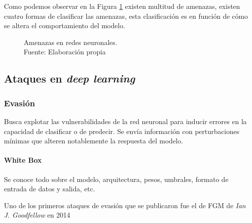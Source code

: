 Como podemos observar en la Figura \ref{fig:art-adversarial-threats} existen multitud de amenazas, existen cuatro formas de clasificar las amenazas, esta clasificación es en función de cómo se altera el comportamiento del modelo.

\begin{figure}[H]
    \centering
    \centerline{}
    \caption{Amenazas en redes neuronales.\\Fuente: Elaboración propia}
    \label{fig:art-adversarial-threats}
\end{figure}



\subsection{Ataques en \textit{deep learning}}

\subsubsection{Evasión}
Busca explotar las vulnerabilidades de la red neuronal para inducir errores en la capacidad de clasificar o de predecir. Se envía información con perturbaciones mínimas que alteren notablemente la respuesta del modelo.

\clearpage
\paragraph{White Box}
Se conoce todo sobre el modelo, arquitectura, pesos, umbrales, formato de entrada de datos y salida, etc. \cite{learning-machine-learning-part-3-attacking}

Uno de los primeros ataques de evasión que se publicaron fue el de \gls{FGM} de \textit{Ian J. Goodfellow} en 2014 \cite{goodfellow2015explaining}

